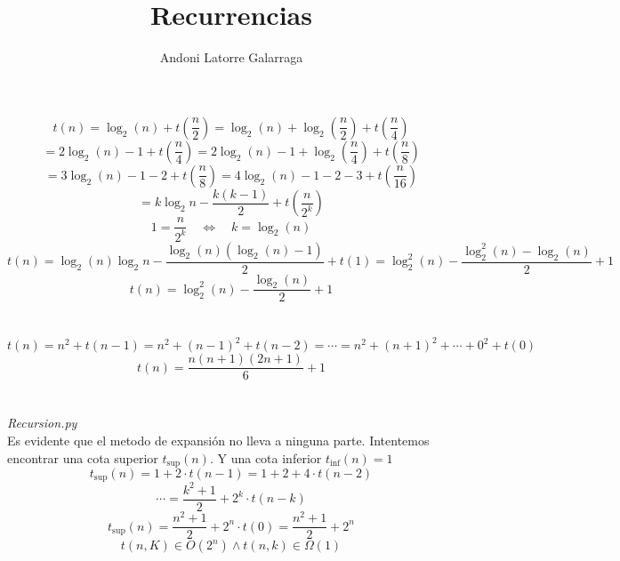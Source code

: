 \documentclass{article}
\title{Recurrencias}
\author{Andoni Latorre Galarraga}
\date{}
\begin{document}
\maketitle

\section{}
$$
t(n) = \log_2(n) + t(\frac{n}{2}) = \log_2(n) + \log_2(\frac{n}{2}) + t(\frac{n}{4})
$$
$$
= 2 \log_2(n) - 1 + t(\frac{n}{4}) = 2 \log_2(n) - 1 + \log_2(\frac{n}{4}) + t(\frac{n}{8})
$$
$$
= 3 \log_2(n) - 1 - 2 + t(\frac{n}{8}) = 4 \log_2(n) - 1 - 2 -3 + t(\frac{n}{16})
$$
$$
= k \log_2 n - \frac{k(k-1)}{2} + t(\frac{n}{2^k})
$$
$$
1 = \frac{n}{2^k} \quad \Leftrightarrow \quad k = \log_2(n)
$$
$$
t(n) = \log_2(n) \log_2 n - \frac{\log_2(n)(\log_2(n)-1)}{2} + t(1) = \log_2^2(n) - \frac{\log_2^2(n) - \log_2(n)}{2} + 1
$$
$$
t(n) = \log_2^2(n) - \frac{\log_2(n)}{2} + 1
$$
\section{}
$$
t(n) = n^2 + t(n-1) = n^2 + (n-1)^2 + t(n-2) = \cdots = n^2 + (n+1)^2 + \cdots + 0^2 + t(0)
$$
$$
t(n) = \frac{n(n+1)(2n+1)}{6}+1
$$
\section{}
\textit{Recursion.py}\\
Es evidente que el metodo de expansión no lleva a ninguna parte. Intentemos encontrar una cota superior $t_{\text{sup}}(n)$. Y una cota inferior $t_{\text{inf}}(n) = 1$
$$
t_{\text{sup}}(n)=1+2 \cdot t(n-1)= 1 + 2 + 4 \cdot t(n-2)
$$
$$
\cdots = \frac{k^2+1}{2} + 2^k \cdot t(n-k)
$$
$$
t_{\text{sup}}(n) = \frac{n^2+1}{2} + 2^n \cdot t(0) = \frac{n^2+1}{2} + 2^n
$$
$$
t(n,K) \in O(2^n) \land t(n,k) \in \Omega(1)
$$
\end{document}
